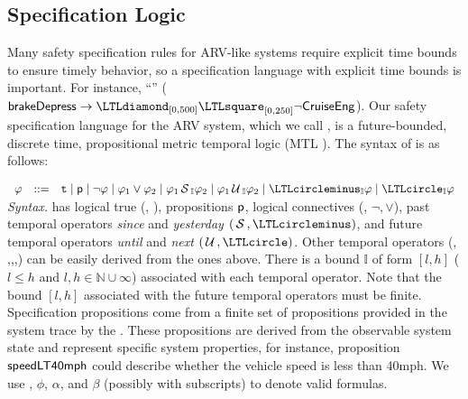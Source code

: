 \subsection{Specification Logic}
Many safety specification rules for ARV-like systems require explicit time bounds to ensure timely behavior,
so a specification language with explicit time bounds is important.
For instance,
``''
($\pred{brakeDepress} \rightarrow \eventually_{[0, 500]} \henceforth_{[0,250]} \neg \pred{CruiseEng}$).
Our safety specification language for the ARV system, which we call \planguage, is a future-bounded,
discrete time, propositional metric temporal logic (MTL \cite{Koymans1990}).
The syntax of \planguage is as follows:

\vspace*{1pt}
\(
\begin{array}{ccc}
\policy & ::=  & \true \mid \pred{p} \mid \neg \policy \mid \policy_1\vee \policy_2\mid
\policy_1\since_{\interval}\policy_2 \mid \policy_1\until_{\interval}\policy_2\mid\yesterday_{\interval}\policy\mid \tomorrow_{\interval}\policy
\end{array}
\) \\
\textit{Syntax.}
\planguage has logical true (\ie, \true),
 propositions $\mathsf{p}$, logical connectives (\ie, $\neg, \vee$),
past temporal operators \emph{since} and \emph{yesterday} $(\since, \yesterday)$,
and future temporal operators \emph{until} and \emph{next} $(\until, \tomorrow)$.
Other temporal operators (\ie, \once,\historically,\eventually,\henceforth) can be easily derived
from the ones above.
There is a bound $\mathbb{I}$ of form $[l,h]$ ($l\leq h$ and $l,h\in\mathbb{N}\cup\infty$)
associated with each temporal operator.
Note that the bound  $[l,h]$ associated with the future temporal operators must be finite.
Specification propositions  come from a finite set of propositions provided in
the system trace by the \sfmap.
These propositions are derived from the observable system state and represent specific system properties, for instance,
proposition $\mathsf{speedLT40mph}$ could describe whether the vehicle speed is less than 40mph.
We use \policy, $\phi$, $\alpha$, and $\beta$ (possibly with subscripts) to denote valid \planguage formulas.
%


